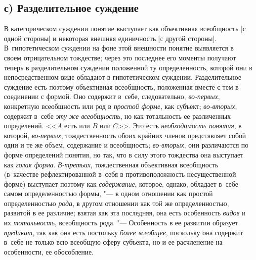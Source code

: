 \subsection[с) Разделительное суждение]{с) Разделительное суждение}
В категорическом суждении понятие выступает как объективная
всеобщность [с одной стороны] и некоторая внешняя единичность [с другой
стороны]. В~гипотетическом суждении на фоне этой внешности понятие
выявляется в своем отрицательном тождестве; через это последнее его моменты
получают теперь в разделительном суждении положенной ту определенность,
которой они в непосредственном виде обладают в гипотетическом суждении.
Разделительное суждение есть поэтому объективная всеобщность, положенная
вместе с тем в соединении с формой. Оно содержит в~себе, следовательно,
{\em во-первых}, конкретную всеобщность или род в {\em простой форме}, как
субъект; {\em во-вторых}, содержит в~себе {\em эту
же всеобщность}, но как тотальность ее
различенных определений. <<$A$ есть или $B$ или $C$>>. Это есть
{\em необходимость понятия}, в которой, {\em во-первых},
тождественность обоих крайних членов представляет собой одни
и те же объем, содержание и всеобщность;
{\em во-вторых}, они
различаются по форме определений понятия, но так, что в силу этого
тождества она выступает как {\em голая
форма}. {\em В-третьих},
тождественная объективная всеобщность (в~качестве
рефлектированной в~себя в противоположность несущественной форме) выступает
поэтому как {\em содержание},
которое, однако, обладает в~себе самом определенностью
формы, "--- в одном отношении как простой определенностью
{\em рода}, в другом
отношении как той же определенностью, развитой в ее различие; взятая как
эта последняя, она есть особенность {\em видов} и их {\em тотальность},
всеобщность рода. "--- Особенность в ее развитии
образует {\em предикат}, так как она есть постольку {\em более всеобщее},
поскольку она содержит в~себе не только всю всеобщую сферу
субъекта, но и ее расчленение на особенности, ее обособление.

